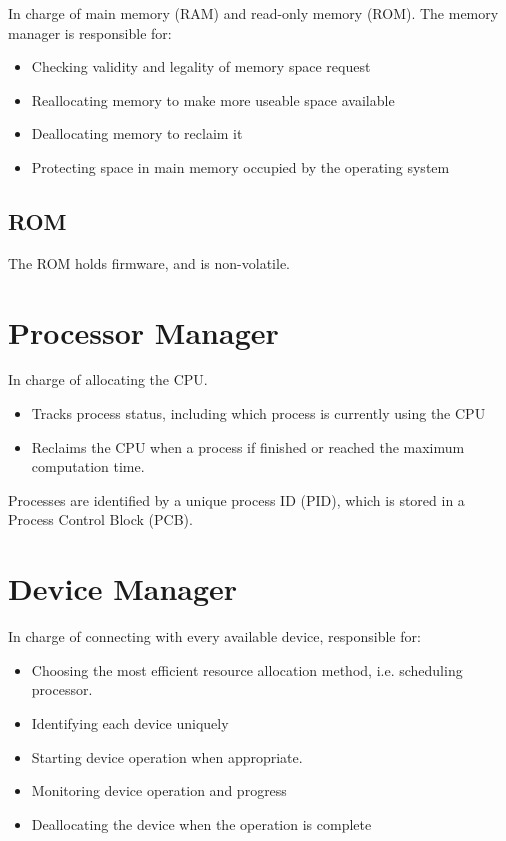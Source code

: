 \documentclass[12pt letter]{report}
\begin{document}
In charge of main memory (RAM) and read-only memory (ROM).
The memory manager is responsible for:
\begin{itemize}
  \item Checking validity and legality of memory space request
  \item Reallocating memory to make more useable space available
  \item Deallocating memory to reclaim it
  \item Protecting space in main memory occupied by the operating system
\end{itemize}

\subsection{ROM}
The ROM holds firmware, and is non-volatile.

\section{Processor Manager}

In charge of allocating the CPU.
\begin{itemize}
  \item Tracks process status, including which process is currently using the CPU
  \item Reclaims the CPU when a process if finished or reached the maximum computation time.
\end{itemize}

Processes are identified by a unique process ID (PID), which is stored in a Process Control Block (PCB).

\section{Device Manager}

In charge of connecting with every available device, responsible for:
\begin{itemize}
  \item Choosing the most efficient resource allocation method, i.e. scheduling processor.
  \item Identifying each device uniquely
  \item Starting device operation when appropriate.
  \item Monitoring device operation and progress
  \item Deallocating the device when the operation is complete
\end{itemize}
\end{document}
